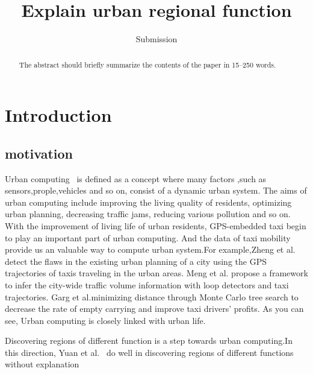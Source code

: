 \documentclass[runningheads]{llncs}
\begin{document}
\title{Explain urban regional function}
\author{Submission}

\maketitle 

\begin{abstract}
The abstract should briefly summarize the contents of the paper in
15--250 words.

\end{abstract}
%


\section{Introduction}

\subsection{motivation}
Urban computing~\cite{Zheng2014UrbanConcepts} is defined as a concept where many factors ,such as sensors,prople,vehicles and so on, consist of a dynamic urban system. %
The aims of urban computing include improving the living quality of residents, optimizing urban planning, decreasing traffic jams, reducing various pollution and so on.
With the improvement of living life of urban residents, GPS-embedded taxi begin to play an important part of urban computing. 
And the data of taxi mobility provide us an valuable way to compute urban system.For example,Zheng et al. ~\cite{Zheng2011taxicabs} detect the flaws in the existing urban planning of a city using the GPS trajectories of taxis traveling in the urban areas. Meng et al.\cite{Meng2017Traffic} propose a framework to infer the city-wide traffic volume information with loop detectors and taxi trajectories. Garg et al.\cite{Garg2018Route}minimizing distance through Monte Carlo tree search to decrease the rate of empty carrying and improve taxi drivers’ profits.
As you can see, Urban computing is closely linked with urban life.

Discovering regions of different function is a step towards urban computing.In this direction, Yuan et al.~\cite{Yuan2012FunctionRegion,Yuan2015FunctionRegion,Yuan2018FunctionRegion} do well in discovering regions of different functions %
without explanation
\end{document}
